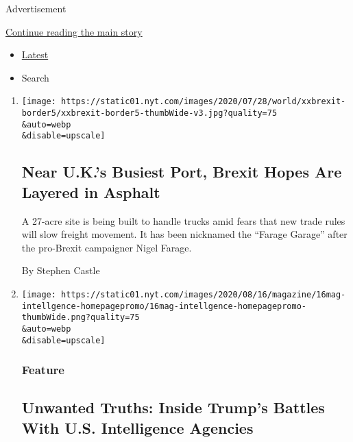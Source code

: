 Advertisement

\protect\hyperlink{after-mid3}{Continue reading the main story}

\begin{itemize}
\tightlist
\item
  \protect\hyperlink{stream-panel}{Latest}
\item
  Search
\end{itemize}

\begin{enumerate}
\def\labelenumi{\arabic{enumi}.}
\item
  \href{/2020/08/08/world/europe/brexit-trucks-dover-mojo.html}{}

  \texttt{[image: https://static01.nyt.com/images/2020/07/28/world/xxbrexit-border5/xxbrexit-border5-thumbWide-v3.jpg?quality=75\\\&auto=webp\\\&disable=upscale]}

  \hypertarget{near-uks-busiest-port-brexit-hopes-are-layered-in-asphalt}{%
  \subsection{Near U.K.'s Busiest Port, Brexit Hopes Are Layered in
  Asphalt}\label{near-uks-busiest-port-brexit-hopes-are-layered-in-asphalt}}

  A 27-acre site is being built to handle trucks amid fears that new
  trade rules will slow freight movement. It has been nicknamed the
  ``Farage Garage'' after the pro-Brexit campaigner Nigel Farage.

  By Stephen Castle
\item
  \href{/2020/08/08/magazine/us-russia-intelligence.html}{}

  \texttt{[image: https://static01.nyt.com/images/2020/08/16/magazine/16mag-intellgence-homepagepromo/16mag-intellgence-homepagepromo-thumbWide.png?quality=75\\\&auto=webp\\\&disable=upscale]}

  \hypertarget{feature}{%
  \subsubsection{Feature}\label{feature}}

  \hypertarget{unwanted-truths-inside-trumps-battles-with-us-intelligence-agencies}{%
  \subsection{Unwanted Truths: Inside Trump's Battles With U.S.
  Intelligence
  Agencies}\label{unwanted-truths-inside-trumps-battles-with-us-intelligence-agencies}}


\end{enumerate}
